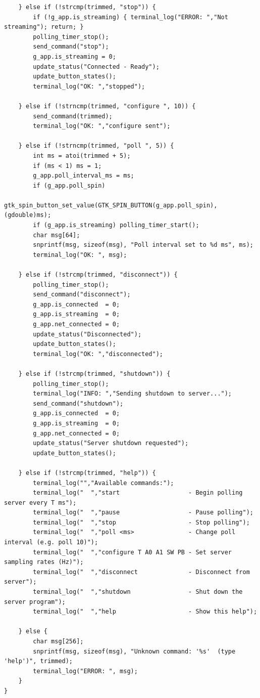 \begin{verbatim}
    } else if (!strcmp(trimmed, "stop")) {
        if (!g_app.is_streaming) { terminal_log("ERROR: ","Not streaming"); return; }
        polling_timer_stop();
        send_command("stop");
        g_app.is_streaming = 0;
        update_status("Connected - Ready");
        update_button_states();
        terminal_log("OK: ","stopped");

    } else if (!strncmp(trimmed, "configure ", 10)) {
        send_command(trimmed);
        terminal_log("OK: ","configure sent");

    } else if (!strncmp(trimmed, "poll ", 5)) {
        int ms = atoi(trimmed + 5);
        if (ms < 1) ms = 1;
        g_app.poll_interval_ms = ms;
        if (g_app.poll_spin)
            gtk_spin_button_set_value(GTK_SPIN_BUTTON(g_app.poll_spin), (gdouble)ms);
        if (g_app.is_streaming) polling_timer_start();
        char msg[64];
        snprintf(msg, sizeof(msg), "Poll interval set to %d ms", ms);
        terminal_log("OK: ", msg);

    } else if (!strcmp(trimmed, "disconnect")) {
        polling_timer_stop();
        send_command("disconnect");
        g_app.is_connected  = 0;
        g_app.is_streaming  = 0;
        g_app.net_connected = 0;
        update_status("Disconnected");
        update_button_states();
        terminal_log("OK: ","disconnected");

    } else if (!strcmp(trimmed, "shutdown")) {
        polling_timer_stop();
        terminal_log("INFO: ","Sending shutdown to server...");
        send_command("shutdown");
        g_app.is_connected  = 0;
        g_app.is_streaming  = 0;
        g_app.net_connected = 0;
        update_status("Server shutdown requested");
        update_button_states();

    } else if (!strcmp(trimmed, "help")) {
        terminal_log("","Available commands:");
        terminal_log("  ","start                   - Begin polling server every T ms");
        terminal_log("  ","pause                   - Pause polling");
        terminal_log("  ","stop                    - Stop polling");
        terminal_log("  ","poll <ms>               - Change poll interval (e.g. poll 10)");
        terminal_log("  ","configure T A0 A1 SW PB - Set server sampling rates (Hz)");
        terminal_log("  ","disconnect              - Disconnect from server");
        terminal_log("  ","shutdown                - Shut down the server program");
        terminal_log("  ","help                    - Show this help");

    } else {
        char msg[256];
        snprintf(msg, sizeof(msg), "Unknown command: '%s'  (type 'help')", trimmed);
        terminal_log("ERROR: ", msg);
    }
}


\end{verbatim}
